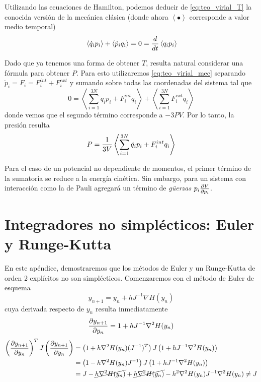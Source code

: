 Utilizando las ecuaciones de Hamilton, podemos deducir de \eqref{eq:teo_virial_T} la conocida versión de la mecánica clásica
(donde ahora $\left< \bullet \right>$ corresponde a valor medio temporal)
\begin{equation}{\label{eq:teo_virial_mec}}
  \left< \dot{q}_ip_i \right> + \left< \dot{p}_iq_i \right> = 0 = \frac{d}{dt}\left< q_ip_i \right>
\end{equation}

Dado que ya tenemos una forma de obtener $T$, resulta natural considerar una fórmula para obtener $P$.
Para esto utilizaremos \eqref{eq:teo_virial_mec} separando $\dot{p}_i = F_i = F_i^{int}+F_i^{ext}$ y sumando sobre todas las coordenadas del sistema tal que
\[ 0 = \left< \sum_{i=1}^{3N} \dot{q}_ip_i + F_i^{int}q_i \right> + \left< \sum_{i=1}^{3N}F_i^{ext}q_i \right>  \]
donde vemos que el segundo término corresponde\cite{BOOK:HAILE} a $-3PV$.
Por lo tanto, la presión resulta
\begin{equation}{\label{eq:teo_virial_P}}
P = \frac{1}{3V}\left< \sum_{i=1}^{3N} \dot{q}_ip_i + F_i^{int}q_i \right>
\end{equation}

Para el caso de un potencial no dependiente de momentos, el primer término de la sumatoria se reduce a la energía cinética.
Sin embargo, para un sistema con interacción como la de Pauli agregará un término de \textit{g\"uerzas} $p_i\frac{\partial V}{\partial p_i}$.

\newpage

\section{Integradores no simplécticos: Euler y Runge-Kutta}{\label{sec:no_simp}}

En este apéndice, demostraremos que los métodos de Euler y un Runge-Kutta de orden 2 explícitos no son simplécticos.
Comenzaremos con el método de Euler de esquema
\[ y_{n+1} = y_n + h J^{-1} \nabla H(y_n) \]
cuya derivada respecto de $y_n$ resulta inmediatamente
\[ \frac{\partial y_{n+1}}{\partial y_n} = 1 + hJ^{-1}\nabla^2H (y_n)\]
\begin{align*}
 \left( \frac{\partial y_{n+1}}{\partial y_n} \right)^T J \left( \frac{\partial y_{n+1}}{\partial y_n} \right) &= \left(1 + h\nabla^2 H(y_n)(J^{-1})^T\right) J \left(1 + hJ^{-1}\nabla^2 H(y_n)\right) \\
 &= \left(1 - h\nabla^2 H(y_n)J^{-1}\right) J \left(1 + hJ^{-1}\nabla^2 H(y_n)\right) \\
 &= J - \cancel{h\nabla^2 H(y_n)} + \cancel{h\nabla^2 H(y_n)} - h^2\nabla^2 H(y_n)J^{-1}\nabla^2 H(y_n) \neq J
\end{align*}

